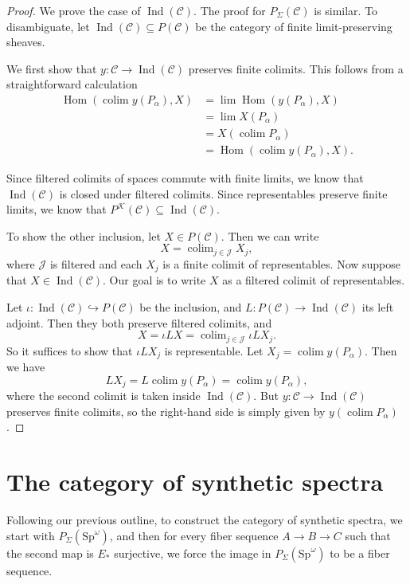 \documentclass{shortart}
\theoremstyle{definition}
\newcommand\C{{\mathcal{C}}}
\newcommand\Sp{{\mathrm{Sp}}}
\DeclareMathOperator\Hom{Hom}
\DeclareMathOperator\Ind{Ind}
\DeclareMathOperator*\colim{colim}
\begin{document}
\begin{proof}
  We prove the case of $\Ind(\C)$. The proof for $P_\Sigma(\C)$ is similar. To disambiguate, let $\Ind(\C) \subseteq P(\C)$ be the category of finite limit-preserving sheaves.

  We first show that $y\colon \C \to \Ind(\C)$ preserves finite colimits. This follows from a straightforward calculation
  \[
    \begin{aligned}
      \Hom\left(\colim y(P_\alpha), X\right) &= \lim \Hom(y(P_\alpha), X)\\
                                             &= \lim X(P_\alpha)\\
                                             &= X\left(\colim P_\alpha\right) \\
                                             &= \Hom\left(\colim y(P_\alpha), X\right).
    \end{aligned}
  \]

  Since filtered colimits of spaces commute with finite limits, we know that $\Ind(\C)$ is closed under filtered colimits. Since representables preserve finite limits, we know that $P^{\mathcal{K}}(\C) \subseteq \Ind(\C)$.

  To show the other inclusion, let $X \in P(\C)$. Then we can write
  \[
    X = \colim_{j \in \mathcal{J}} X_j,
  \]
  where $\mathcal{J}$ is filtered and each $X_j$ is a finite colimit of representables. Now suppose that $X \in \Ind(\C)$. Our goal is to write $X$ as a filtered colimit of representables.

  Let $\iota \colon \Ind(\C) \hookrightarrow P(\C)$ be the inclusion, and $L \colon P(\C) \to \Ind(\C)$ its left adjoint. Then they both preserve filtered colimits, and
  \[
    X = \iota LX = \colim_{j \in \mathcal{J}} \iota L X_j.
  \]
  So it suffices to show that $\iota L X_j$ is representable. Let $X_j = \colim y(P_\alpha)$. Then we have
  \[
    LX_j = L \colim y(P_\alpha) = \colim y(P_\alpha),
  \]
  where the second colimit is taken inside $\Ind(\C)$. But $y \colon \C \to \Ind(\C)$ preserves finite colimits, so the right-hand side is simply given by $y\left(\colim P_\alpha\right)$.
\end{proof}

\section{The category of synthetic spectra}
Following our previous outline, to construct the category of synthetic spectra, we start with $P_\Sigma(\Sp^\omega)$, and then for every fiber sequence $A \to B \to C$ such that the second map is $E_*$ surjective, we force the image in $P_\Sigma(\Sp^\omega)$ to be a fiber sequence.
\end{document}
